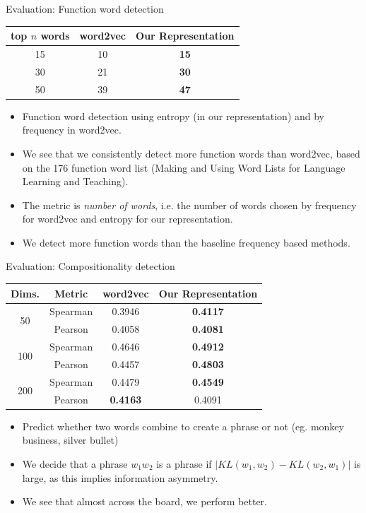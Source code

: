 \documentclass[8pt]{beamer}
\begin{document}
\begin{frame}{Evaluation: Function word detection}
    \begin{tabular}{c|cc}
        top $n$ words & \bf word2vec & \bf Our Representation  \\ \hline
        15  & 10 & \bf 15 \\
        30  & 21 & \bf 30 \\
        50  & 39 & \bf 47  \\
    \end{tabular}

\begin{itemize}
\item Function word detection using entropy (in our representation) and by frequency in word2vec.
\item We see that we consistently detect more function words than word2vec, based on the 176 function word list (Making and Using Word Lists for Language Learning and Teaching).
\item The metric is \emph{number of words}, i.e. the number of words chosen by frequency for word2vec and entropy for our representation.
\item We detect more function words than the baseline frequency based methods. 
\end{itemize}
\end{frame}


\begin{frame}{Evaluation: Compositionality detection}
    \begin{tabular}{c|c|cc}
        \bf Dims.               & \bf Metric& \bf word2vec  & \bf Our Representation    \\ \hline
        \multirow{2}{*}{50}     & Spearman  & 0.3946    & \bf 0.4117            \\
                                & Pearson   & 0.4058    & \bf 0.4081            \\ \hline
        \multirow{2}{*}{100}    & Spearman  & 0.4646    & \bf 0.4912            \\
                                & Pearson   & 0.4457    & \bf 0.4803            \\ \hline
        \multirow{2}{*}{200}    & Spearman  & 0.4479    & \bf 0.4549            \\
                                & Pearson   & \bf 0.4163& 0.4091                \\
    \end{tabular}
\begin{itemize}
  \item Predict whether two words combine to create a phrase or not (eg. monkey business, silver bullet)
  \item We decide that a phrase $w_1 w_2$ is a phrase if $|KL(w_1, w_2) - KL(w_2, w_1)|$ is large, as this implies information asymmetry.
  \item We see that almost across the board, we perform better.
\end{itemize}
\end{frame}
\end{document}
